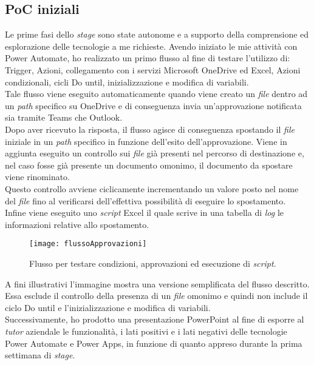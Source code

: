 \subsection{PoC iniziali}
Le prime fasi dello \emph{stage} sono state autonome e a supporto della comprensione ed esplorazione delle tecnologie a me richieste. 
Avendo iniziato le mie attività con Power Automate, ho realizzato un primo flusso al fine di testare l'utilizzo di: Trigger, Azioni, collegamento con i servizi Microsoft OneDrive ed Excel, Azioni condizionali, cicli Do until, inizializzazione e modifica di variabili.\\
Tale flusso viene eseguito automaticamente quando viene creato un \emph{file} dentro ad un \emph{path} specifico su OneDrive e di conseguenza invia un'approvazione notificata sia tramite Teams che Outlook.\\
Dopo aver ricevuto la risposta, il flusso agisce di conseguenza spostando il \emph{file} iniziale in un \emph{path} specifico in funzione dell'esito dell'approvazione.
Viene in aggiunta eseguito un controllo sui \emph{file} già presenti nel percorso di destinazione e, nel caso fosse già presente un documento omonimo, il documento da spostare viene rinominato.\\
Questo controllo avviene ciclicamente incrementando un valore posto nel nome del \emph{file} fino al verificarsi dell'effettiva possibilità di eseguire lo spostamento.\\
Infine viene eseguito uno \emph{script} Excel il quale scrive in una tabella di \emph{log} le informazioni relative allo spostamento.
\begin{figure}[htbp] 
    \centering 
    \texttt{[image: flussoApprovazioni]} 
    \caption{Flusso per testare condizioni, approvazioni ed esecuzione di \emph{script}.}
    \label{fig:flussoApprovazioni}
\end{figure}
\newline \noindent A fini illustrativi l'immagine mostra una versione semplificata del flusso descritto. Essa esclude il controllo della presenza di un \emph{file} omonimo e quindi non include il ciclo Do until e l'inizializzazione e modifica di variabili.\\
Successivamente, ho prodotto una presentazione PowerPoint al fine di esporre al \emph{\emph{tutor}} aziendale le funzionalità, i lati positivi e i lati negativi delle tecnologie Power Automate e Power Apps, in funzione di quanto appreso durante la prima settimana di \emph{stage}.

